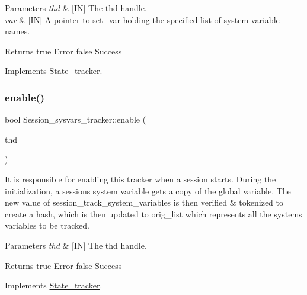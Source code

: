 \begin{DoxyParams}{Parameters}
{\em thd} & \mbox{[}IN\mbox{]} The thd handle. \\
\hline
{\em var} & \mbox{[}IN\mbox{]} A pointer to \mbox{\hyperlink{classset__var}{set\+\_\+var}} holding the specified list of system variable names.\\
\hline
\end{DoxyParams}
\begin{DoxyReturn}{Returns}
true Error false Success 
\end{DoxyReturn}


Implements \mbox{\hyperlink{classState__tracker_a50923266a6300e657b70dc4f0125782c}{State\+\_\+tracker}}.

\mbox{\label{classSession__sysvars__tracker_abe0b7f50ef4c4e269a077f7784d2ce28}} 
\subsubsection{\texorpdfstring{enable()}{enable()}}
{\footnotesize\ttfamily bool Session\+\_\+sysvars\+\_\+tracker\+::enable (\begin{DoxyParamCaption}\item[{T\+HD $\ast$}]{thd }\end{DoxyParamCaption})\hspace{0.3cm}{\ttfamily [virtual]}}



It is responsible for enabling this tracker when a session starts. During the initialization, a session\textquotesingle{}s system variable gets a copy of the global variable. The new value of session\+\_\+track\+\_\+system\+\_\+variables is then verified \& tokenized to create a hash, which is then updated to orig\+\_\+list which represents all the systems variables to be tracked. 


\begin{DoxyParams}{Parameters}
{\em thd} & \mbox{[}IN\mbox{]} The thd handle.\\
\hline
\end{DoxyParams}
\begin{DoxyReturn}{Returns}
true Error false Success 
\end{DoxyReturn}


Implements \mbox{\hyperlink{classState__tracker_a65cd4b0d77f079f4c41620c0bf314939}{State\+\_\+tracker}}.

